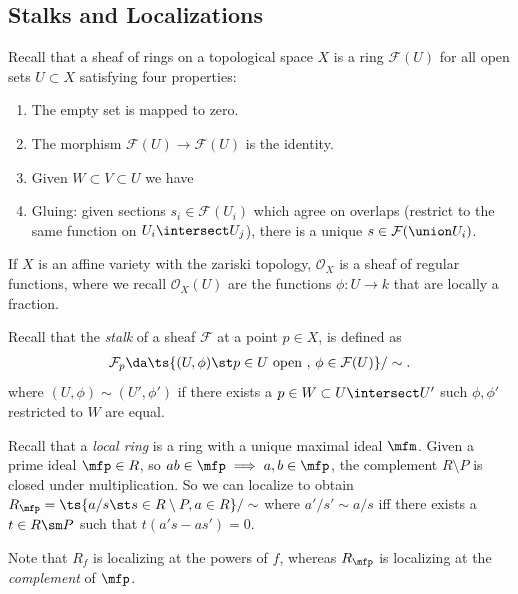 \hypertarget{stalks-and-localizations}{%
\subsection{Stalks and Localizations}\label{stalks-and-localizations}}

Recall that a sheaf of rings on a topological space \(X\) is a ring
\(\mathcal{F}(U)\) for all open sets \(U\subset X\) satisfying four
properties:

\begin{enumerate}
\def\labelenumi{\arabic{enumi}.}
\item
  The empty set is mapped to zero.
\item
  The morphism \(\mathcal{F}(U)\to \mathcal{F}(U)\) is the identity.
\item
  Given \(W\subset V\subset U\) we have
\item
  Gluing: given sections \(s_i \in\mathcal{F}(U_i)\) which agree on
  overlaps (restrict to the same function on \(U_i\intersect U_j\)),
  there is a unique \(s\in \mathcal{F}(\union U_i)\).
\end{enumerate}

\begin{example}

If \(X\) is an affine variety with the zariski topology,
\(\mathcal{O}_X\) is a sheaf of regular functions, where we recall
\(\mathcal{O}_X(U)\) are the functions \(\phi: U\to k\) that are locally
a fraction.

\end{example}

Recall that the \emph{stalk} of a sheaf \(\mathcal{F}\) at a point
\(p\in X\), is defined as
\begin{align*}  
\mathcal{F}_p \da \ts{(U, \phi) \st p\in U \text{ open },\, \phi \in \mathcal{F}(U)}/\sim
.\end{align*} where \((U, \phi) \sim (U', \phi')\) if there exists a
\(p\in W \subset U\intersect U'\) such \(\phi, \phi'\) restricted to
\(W\) are equal.

Recall that a \emph{local ring} is a ring with a unique maximal ideal
\(\mfm\). Given a prime ideal \(\mfp \in R\), so
\(ab\in \mfp \implies a,b\in \mfp\), the complement \(R\setminus P\) is
closed under multiplication. So we can localize to obtain
\(R_\mfp = \ts{a/s \st s\in R\setminus P, a\in R}/\sim\) where
\(a'/s' \sim a/s\) iff there exists a \(t\in R\sm P\) such that
\(t(a's - as') = 0\).

\begin{warnings}

Note that \(R_f\) is localizing at the powers of \(f\), whereas
\(R_\mfp\) is localizing at the \emph{complement} of \(\mfp\).

\end{warnings}

